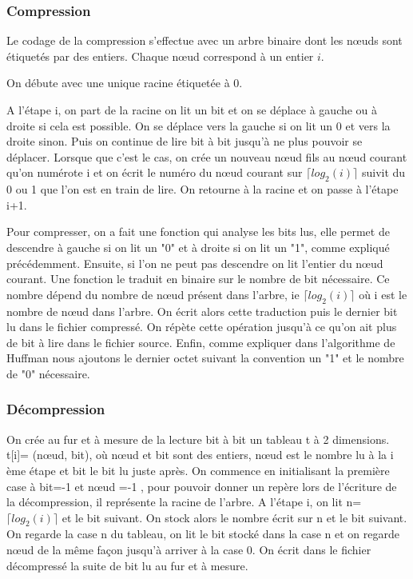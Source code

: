 \documentclass{report}
\begin{document}
\subsubsection{Compression}
Le codage de la compression s'effectue avec un arbre binaire dont les nœuds sont étiquetés par des entiers. Chaque nœud correspond à un entier $i$. 

On débute avec une unique racine étiquetée à 0.

A l'étape i, on part de la racine on lit un bit et on se déplace à gauche ou à droite si cela est possible. On se déplace vers la gauche si on lit un 0 et vers la droite sinon. Puis on continue de lire bit à bit jusqu'à ne plus pouvoir se déplacer. Lorsque que c'est le cas, on crée un nouveau nœud fils au nœud courant qu'on numérote i et on écrit le numéro du nœud courant sur $\lceil log_{2}(i) \rceil$ suivit du 0 ou 1 que l'on est en train de lire.
On retourne à la racine et on passe à l'étape i+1.

Pour compresser, on a fait une fonction qui analyse les bits lus, elle permet de descendre à gauche si on lit un "0" et à droite si on lit un "1", comme expliqué précédemment. Ensuite, si l'on ne peut pas descendre on lit l'entier du nœud courant. Une fonction le traduit en binaire sur le nombre de bit nécessaire. Ce nombre dépend du nombre de nœud présent dans l'arbre, ie $\lceil log_{2}(i) \rceil$ où i est le nombre de nœud dans l'arbre. 
On écrit alors cette traduction puis le dernier bit lu dans le fichier compressé. On répète cette opération jusqu'à ce qu'on ait plus de bit  à lire dans le fichier source.
Enfin, comme expliquer dans l'algorithme de Huffman nous ajoutons le dernier octet suivant la convention un "1" et le nombre de "0" nécessaire.  

\subsubsection{Décompression}
On crée au fur et à mesure de la lecture bit à bit un tableau t à 2 dimensions.  t[i]= (nœud, bit), où nœud et bit sont des entiers, nœud est le nombre lu à la i ème étape et bit le bit lu juste après. 
On commence en initialisant la première case à  bit=-1 et nœud =-1 , pour pouvoir donner un repère lors de l'écriture de la décompression, il représente la racine de l'arbre.  
A l'étape i, on lit n=$\lceil log_{2}(i) \rceil$ et le bit suivant. On stock alors le nombre écrit sur n et le bit suivant. On regarde la case n du tableau, on lit le bit stocké dans la case n et on regarde nœud de la même façon jusqu'à arriver à la case 0. On écrit dans le fichier décompressé la suite de bit lu au fur et à mesure.
\end{document}

